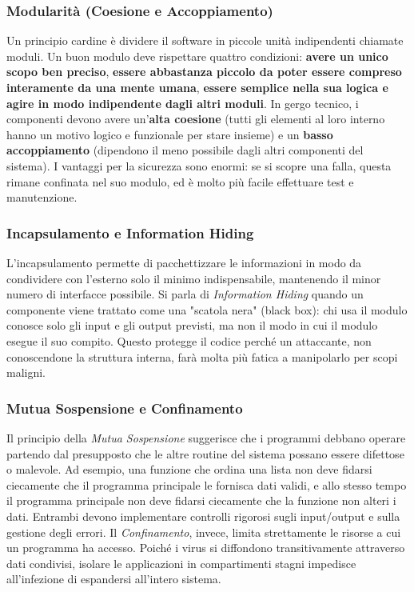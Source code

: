 \documentclass{article}
\begin{document}
\subsubsection*{Modularità (Coesione e Accoppiamento)}

Un principio cardine è dividere il software in piccole unità indipendenti chiamate moduli. Un buon modulo deve rispettare quattro condizioni: \textbf{avere un unico scopo ben preciso}, \textbf{essere abbastanza piccolo da poter essere compreso interamente da una mente umana}, \textbf{essere semplice nella sua logica e agire in modo indipendente dagli altri moduli}. In gergo tecnico, i componenti devono avere un'\textbf{alta coesione} (tutti gli elementi al loro interno hanno un motivo logico e funzionale per stare insieme) e un \textbf{basso accoppiamento} (dipendono il meno possibile dagli altri componenti del sistema). I vantaggi per la sicurezza sono enormi: se si scopre una falla, questa rimane confinata nel suo modulo, ed è molto più facile effettuare test e manutenzione.

\subsubsection*{Incapsulamento e Information Hiding}

L'incapsulamento permette di pacchettizzare le informazioni in modo da condividere con l'esterno solo il minimo indispensabile, mantenendo il minor numero di interfacce possibile. Si parla di \textit{Information Hiding} quando un componente viene trattato come una "scatola nera" (black box): chi usa il modulo conosce solo gli input e gli output previsti, ma non il modo in cui il modulo esegue il suo compito. Questo protegge il codice perché un attaccante, non conoscendone la struttura interna, farà molta più fatica a manipolarlo per scopi maligni.

\subsubsection*{Mutua Sospensione e Confinamento}

Il principio della \textit{Mutua Sospensione} suggerisce che i programmi debbano operare partendo dal presupposto che le altre routine del sistema possano essere difettose o malevole. Ad esempio, una funzione che ordina una lista non deve fidarsi ciecamente che il programma principale le fornisca dati validi, e allo stesso tempo il programma principale non deve fidarsi ciecamente che la funzione non alteri i dati. Entrambi devono implementare controlli rigorosi sugli input/output e sulla gestione degli errori. Il \textit{Confinamento}, invece, limita strettamente le risorse a cui un programma ha accesso. Poiché i virus si diffondono transitivamente attraverso dati condivisi, isolare le applicazioni in compartimenti stagni impedisce all'infezione di espandersi all'intero sistema.
\end{document}
